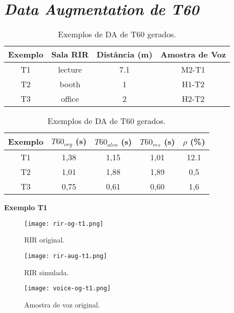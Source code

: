 \pagebreak
\section{\textit{Data Augmentation de T60}}

\begin{table} [H]
    \centering
    \caption{Exemplos de DA de T60 gerados.}
    \label{tbl-a:da-t60}
    \begin{tabular}{c|c|c|c}

        \textbf{Exemplo} & 
        \textbf{Sala RIR} & 
        \textbf{Distância (m)} &
        \textbf{Amostra de Voz} \\
        \hline 

        T1 & lecture & 7.1 & M2-T1 \\
        T2 & booth & 1 & H1-T2 \\
        T3 & office & 2 & H2-T2 \\

    \end{tabular}
    \bigbreak
    \bigbreak
    \begin{tabular}{c|c|c|c|c}

        \textbf{Exemplo} & 
        \textbf{$T60_{org}$ (s)} & 
        \textbf{$T60_{alvo}$ (s)} &
        \textbf{$T60_{res}$ (s)} & 
        \textbf{$\rho$ (\%)} \\
        \hline 

        T1 & 1,38 & 1,15 & 1,01 & 12.1 \\
        T2 & 1,01 & 1,88 & 1,89 & 0,5 \\
        T3 & 0,75 & 0,61 & 0,60 & 1,6 \\

    \end{tabular}
\end{table}

\pagebreak
{\Large \textbf{Exemplo T1}}

\begin{figure} [H]
    \centering
    \texttt{[image: rir-og-t1.png]}
    \caption{RIR original.}
    \label{fig-a:rir-og-t1}
\end{figure} 

\begin{figure} [H]
    \centering
    \texttt{[image: rir-aug-t1.png]}
    \caption{RIR simulada.}
    \label{fig-a:rir-aug-t1}
\end{figure} 

\begin{figure} [H]
    \centering
    \texttt{[image: voice-og-t1.png]}
    \caption{Amostra de voz original.}
    \label{fig-a:voice-og-t1}
\end{figure} 

